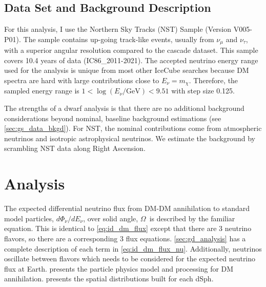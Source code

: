 \subsection{Data Set and Background Description} \label{sec:icDM_data_bkgd}

For this analysis, I use the Northern Sky Tracks (NST) Sample (Version V005-P01).
The sample contains up-going track-like events, usually from $\nu_\mu$ and $\nu_\tau$, with a superior angular resolution compared to the cascade dataset.
This sample covers 10.4 years of data (IC86\_2011-2021).
The accepted neutrino energy range used for the analysis is unique from most other IceCube searches because DM spectra are hard with large contributions close to $E_\nu = m_\chi$.
Therefore, the sampled energy range is $1 < \log(E_\nu /\textrm{GeV}) < 9.51$ with step size 0.125.

The strengths of a dwarf analysis is that there are no additional background considerations beyond nominal, baseline background estimations (see \cref{sec:gs_data_bkgd}).
For NST, the nominal contributions come from atmospheric neutrinos and isotropic astrophysical neutrinos.
We estimate the background by scrambling NST data along Right Ascension.

\section{Analysis}\label{sec:icDM_analysis}

The expected differential neutrino flux from DM-DM annihilation to standard model
particles, $d\Phi_{\nu}/dE_{\nu}$, over solid angle, $\Omega$~is described by the familiar equation.
\iddmannilationNu
This is identical to \cref{eq:id_dm_flux} except that there are 3 neutrino flavors, so there are a corresponding 3 flux equations.
\cref{sec:gd_analysis} has a complete description of each term in \cref{eq:id_dm_flux_nu}.
Additionally, neutrinos oscillate between flavors which needs to be considered for the expected neutrino flux at Earth.
 presents the particle physics model and processing for DM annihilation.
 presents the spatial distributions built for each dSph.

